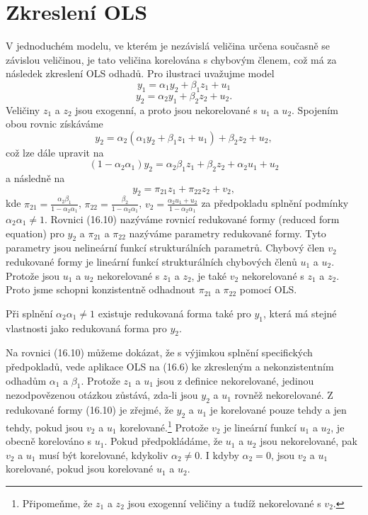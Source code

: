 \section{Zkreslení OLS}

V jednoduchém modelu, ve kterém je nezávislá veličina určena současně se závislou veličinou, je tato veličina korelována s chybovým členem, což má za následek zkreslení OLS odhadů. Pro ilustraci uvažujme model
\begin{equation}
y_1 = \alpha_1 y_2 + \beta_1 z_1 + u_1
\end{equation}
\begin{equation}
y_2 = \alpha_2 y_1 + \beta_2 z_2 + u_2.
\end{equation}
Veličiny $z_1$ a $z_2$ jsou exogenní, a proto jsou nekorelované s $u_1$ a $u_2$. Spojením obou rovnic získáváme
\begin{equation}
y_2 = \alpha_2 (\alpha_1 y_2 + \beta_1 z_1 + u_1) + \beta_2 z_2 + u_2,
\end{equation}
což lze dále upravit na
\begin{equation}
(1 - \alpha_2 \alpha_1)y_2 = \alpha_2 \beta_1 z_1 + \beta_2 z_2 + \alpha_2 u_1 + u_2
\end{equation}
a následně na
\begin{equation}
y_2 = \pi_{21}z_1 + \pi_{22}z_2 + v_2,
\end{equation}
kde $\pi_{21} = \frac{\alpha_2 \beta_1}{1 - \alpha_2 \alpha_1}$, $\pi_{22} = \frac{\beta_2}{1 - \alpha_2 \alpha_1}$, $v_2 = \frac{\alpha_2 u_1 + u_2}{1 - \alpha_2 \alpha_1}$ za předpokladu splnění podmínky $\alpha_2 \alpha_1 \ne 1$. Rovnici (16.10) nazýváme rovnicí redukované formy (reduced form equation) pro $y_2$ a $\pi_{21}$ a $\pi_{22}$ nazýváme parametry redukované formy. Tyto parametry jsou nelineární funkcí strukturálních parametrů. Chybový člen $v_2$ redukované formy je lineární funkcí strukturálních chybových členů $u_1$ a $u_2$. Protože jsou $u_1$ a $u_2$ nekorelované s $z_1$ a $z_2$, je také $v_2$ nekorelované s $z_1$ a $z_2$. Proto jsme schopni konzistentně odhadnout $\pi_{21}$ a $\pi_{22}$ pomocí OLS.

Při splnění $\alpha_2 \alpha_1 \ne 1$ existuje redukovaná forma také pro $y_1$, která má stejné vlastnosti jako redukovaná forma pro $y_2$.

Na rovnici (16.10) můžeme dokázat, že s výjimkou splnění specifických předpokladů, vede aplikace OLS na (16.6) ke zkresleným a nekonzistentním odhadům $\alpha_1$ a $\beta_1$. Protože $z_1$ a $u_1$ jsou z definice nekorelované, jedinou nezodpovězenou otázkou zůstává, zda-li jsou $y_2$ a $u_1$ rovněž nekorelované. Z redukované formy (16.10) je zřejmé, že $y_2$ a $u_1$ je korelované pouze tehdy a jen tehdy, pokud jsou $v_2$ a $u_1$ korelované.\footnote{Připomeňme, že $z_1$ a $z_2$ jsou exogenní veličiny a tudíž nekorelované s $v_2$.} Protože $v_2$ je lineární funkcí $u_1$  a $u_2$, je obecně korelováno s $u_1$. Pokud předpokládáme, že $u_1$ a $u_2$ jsou nekorelované, pak $v_2$ a $u_1$ musí být korelované, kdykoliv $\alpha_2 \ne 0$. I kdyby $\alpha_2 = 0$, jsou $v_2$ a $u_1$ korelované, pokud jsou korelované $u_1$ a $u_2$.

